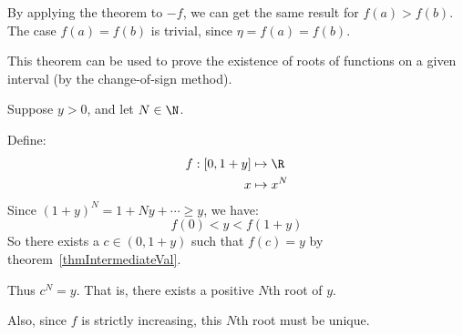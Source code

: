 \documentclass[../Main.tex]{subfiles}
\begin{document}
\begin{remarks}
    \item By applying the theorem to $-f$, we can get the same result for $f(a) > f(b)$. The case $f(a) = f(b)$ is trivial, since $\eta = f(a) = f(b)$.
    \item This theorem can be used to prove the existence of roots of functions on a given interval (by the change-of-sign method).
\end{remarks}
\begin{example}
    Suppose $y > 0$, and let $N \in \N$.\par
    Define:
    \begin{align*}
        f : [0, 1+y] &\mapsto \R \\
        x &\mapsto x^N
    \end{align*}
    Since $(1+y)^N = 1 + Ny + \cdots \geq y$, we have:
    \begin{equation*}
        f(0) < y < f(1+y)
    \end{equation*}
    So there exists a $c \in (0, 1+y)$ such that $f(c) = y$ by theorem~\ref{thmIntermediateVal}.\par
    Thus $c^N = y$. That is, there exists a positive $N$th root of $y$.\par
    Also, since $f$ is strictly increasing, this $N$th root must be unique.
\end{example}
\end{document}
